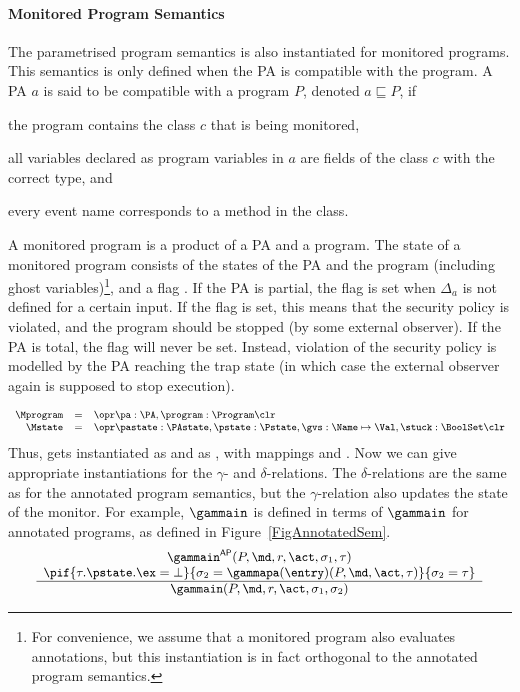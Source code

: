 \paragraph{Monitored Program Semantics}
The parametrised program semantics is also instantiated for monitored
programs. This semantics is only defined when the PA is compatible
with the program. A PA \(a\) is said to be compatible with a program
\(P\), denoted \(a \sqsubseteq P\), if
\begin{inparaenum}
\item the program contains the class \(c\) that is being monitored,
\item all variables declared as program variables in
\(a\) are fields of the class \(c\) with the correct type, and
\item every event name corresponds to a method in the class.
\end{inparaenum}
A monitored program is a product of a PA and a program. The state of a
monitored program consists of the states of the PA and the program
(including ghost variables)\footnote{For convenience, we assume that a
monitored program also evaluates annotations, but this instantiation
is in fact orthogonal to the annotated program semantics.}, and a flag
\stuck. If the PA is partial, the flag
\stuck is set when \(\Delta_a\) is not defined for a
certain input. If the flag is set, this means that the security policy
is violated, and the program should be stopped (by some external
observer). If the PA is total, the \stuck flag will never be
set. Instead, violation of the security policy is modelled by the PA
reaching the trap state \halted (in which case the external observer
again is supposed to stop execution).

\vspace*{-1em}
\[
{\small
\begin{array}{rcl}
\Mprogram & =  & \opr \pa : \PA, \program : \Program \clr\\
\Mstate & = & \opr \pastate : \PAstate, \pstate : \Pstate, \gvs :  \Name \mapsto \Val, \stuck
: \BoolSet \clr
\end{array}}
\]
Thus, \FullProgram gets instantiated as \Mprogram and \FullState as
\Mstate, with mappings \program and \pstate. Now we can give
appropriate instantiations for the \(\gamma\)- and
\(\delta\)-relations. The \(\delta\)-relations are the same as
for the annotated program semantics, but the \(\gamma\)-relation also
updates the state of the monitor. For example, \(\gammain\) is defined
in terms of \(\gammain\) for annotated programs, as defined in
Figure~\ref{FigAnnotatedSem}.
\[
{\small
\begin{array}{c}
\gammain^{\mathsf{AP}}(P, \md, r, \act, \sigma_1, \tau) \\
\pif{\tau.\pstate.\ex = \bot}
    {\sigma_2 = \gammapa(\entry)(P, \md, \act, \tau)}
    {\sigma_2 = \tau}\\
\hline
\gammain(P, \md, r, \act, \sigma_1, \sigma_2)
\end{array}}
\]


